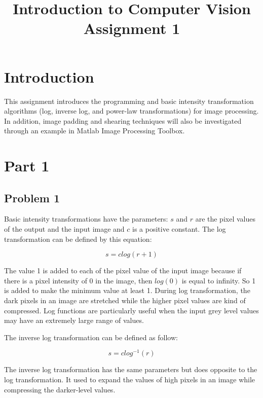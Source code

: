 \documentclass[conference]{IEEEtran}
\begin{document}
\title{Introduction to Computer Vision Assignment 1\\
}

\author{
}
\maketitle

\section{Introduction}

This assignment introduces the programming and basic intensity transformation algorithms (log, inverse log, and power-law transformations) for image processing. In addition,  image padding and shearing techniques will also be investigated through an example in Matlab Image Processing Toolbox.

\section{Part 1}

\subsection{Problem 1}

Basic intensity transformations have the parameters: \(s\) and \(r\) are the pixel values of the output and the input image and \(c\) is a positive constant. The log transformation can be defined by this equation:

\[ s = c log(r + 1) \]

The value 1 is added to each of the pixel value of the input image because if there is a pixel intensity of 0 in the image, then \(log(0)\) is equal to infinity. So 1 is added to make the minimum value at least 1. During log transformation, the dark pixels in an image are stretched while the higher pixel values are kind of compressed. Log functions are particularly useful when the input grey level values may have an extremely large range of values. 

The inverse log transformation can be defined as follow:

\[ s = c log^{-1}(r) \]

The inverse log transformation has the same parameters but does opposite to the log transformation. It used to expand the values of high pixels in an image while compressing the darker-level values.
\end{document}
